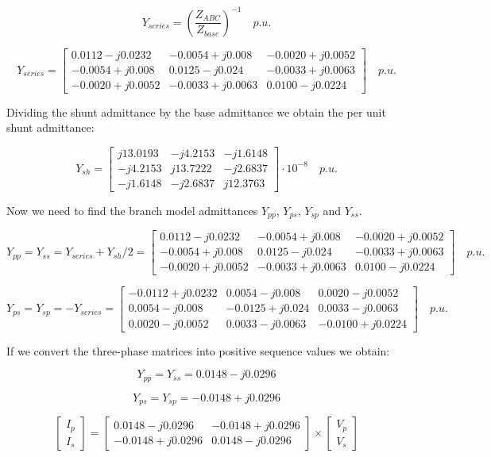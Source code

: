 \documentclass{tufte-book}
\begin{document}
$$
Y_{series} = \left(\frac{Z_{ABC}}{Z_{base}}\right)^{-1} \quad p.u.
$$

$$
Y_{series} = \left[ \begin{array}{ccc}
0.0112-j0.0232  & -0.0054+j0.008   & -0.0020+j0.0052 \\ -0.0054+j0.008  &  0.0125-j0.024 & -0.0033+j0.0063 \\ -0.0020+j0.0052 &  -0.0033+j0.0063 & 0.0100-j0.0224
\end{array} \right]\quad  p.u.
$$

Dividing the shunt admittance by the base admittance we obtain the per unit shunt admittance:

$$
Y_{sh} = \left[ \begin{array}{ccc}
j13.0193 & -j4.2153 &  -j1.6148 \\
-j4.2153 & j13.7222 & -j2.6837 \\ 
-j1.6148 & -j2.6837 & j12.3763
\end{array} \right] \cdot 10^{-8}  \quad p.u.
$$

Now we need to find the branch model admittances $Y_{pp}$, $Y_{ps}$, $Y_{sp}$ and $Y_{ss}$.

$$
Y_{pp} = Y_{ss} = Y_{series} + Y_{sh}/2 = \left[ \begin{array}{ccc}
0.0112-j0.0232  & -0.0054+j0.008   & -0.0020+j0.0052 \\ -0.0054+j0.008  &  0.0125-j0.024 & -0.0033+j0.0063 \\ -0.0020+j0.0052 &  -0.0033+j0.0063 & 0.0100-j0.0224
\end{array} \right]\quad  p.u.
$$

$$
Y_{ps} = Y_{sp} = -Y_{series} = \left[ \begin{array}{ccc}
-0.0112+j0.0232  & 0.0054-j0.008   & 0.0020-j0.0052 \\  0.0054-j0.008  &  -0.0125+j0.024 & 0.0033-j0.0063 \\  0.0020-j0.0052 &  0.0033-j0.0063 & -0.0100+j0.0224
\end{array} \right]\quad  p.u.
$$

If we convert the three-phase matrices into positive sequence values we obtain:

$$
Y_{pp} = Y_{ss} = 0.0148 -j0.0296
$$

$$
Y_{ps} = Y_{sp} = -0.0148 +j0.0296
$$


$$
\left[\begin{array}{c}
I_p \\
I_s
\end{array}\right] = \left[\begin{array}{cc}
0.0148 -j0.0296 & -0.0148 +j0.0296\\
-0.0148 +j0.0296 & 0.0148 -j0.0296
\end{array}\right] \times \left[\begin{array}{c}
V_p \\
V_s
\end{array}\right]
$$
\end{document}

